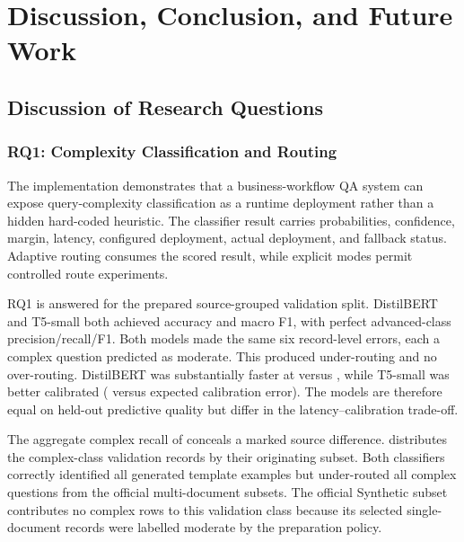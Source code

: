 \chapter{Discussion, Conclusion, and Future Work}
\label{chap:discussion}

\section{Discussion of Research Questions}

\subsection{RQ1: Complexity Classification and Routing}
\label{sec:rq1-classifier-discussion}

The implementation demonstrates that a business-workflow QA system can expose
query-complexity classification as a runtime deployment rather than a hidden
hard-coded heuristic. The classifier result carries probabilities, confidence,
margin, latency, configured deployment, actual deployment, and fallback status.
Adaptive routing consumes the scored result, while explicit modes permit
controlled route experiments.

RQ1 is answered for the prepared source-grouped validation split. DistilBERT
and T5-small both achieved \FinalDistilBERTAccuracy{} accuracy and
\FinalDistilBERTMacroFOne{} macro F1, with perfect advanced-class
precision/recall/F1. Both models made the same six record-level errors, each a
complex question predicted as moderate. This produced \FinalUnderRouting{}
under-routing and no over-routing. DistilBERT was substantially faster at
\FinalDistilBERTLatency{} versus \FinalTFiveLatency{}, while T5-small was
better calibrated (\FinalTFiveECE{} versus \FinalDistilBERTECE{} expected
calibration error). The models are therefore equal on held-out predictive
quality but differ in the latency--calibration trade-off.

The aggregate complex recall of \FinalComplexRecall{} conceals a marked source
difference.  distributes the complex-class
validation records by their originating subset. Both classifiers correctly
identified all \FinalTemplateComplexRecords{} generated template examples but
under-routed all \FinalOfficialComplexRecords{} complex questions from the
official multi-document subsets. The official Synthetic subset contributes no
complex rows to this validation class because its selected single-document
records were labelled moderate by the preparation policy.

